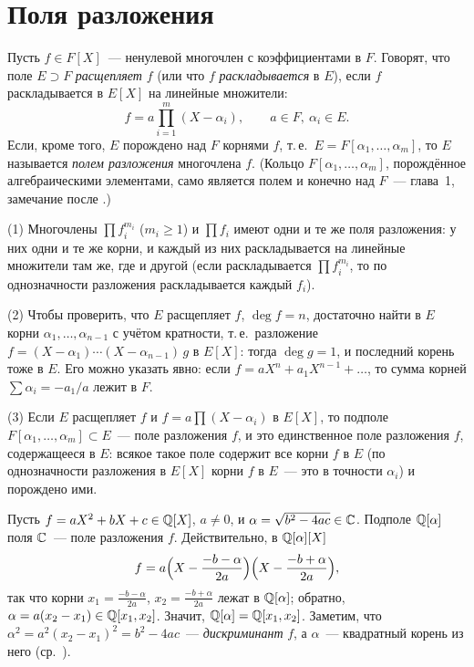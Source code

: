 \section{Поля разложения}

Пусть $f\in F[X]$~--- ненулевой многочлен с коэффициентами в $F$. Говорят, что поле $E\supset F$ \emph{расщепляет} $f$ (или что
$f$ \emph{раскладывается} в $E$), если $f$ раскладывается в $E[X]$ на линейные множители:
\[
f=a\prod_{i=1}^m(X-\alpha_i),\qquad a\in F,\ \alpha_i\in E .
\]
Если, кроме того, $E$ порождено над $F$ корнями $f$, т.\,е.\ $E=F[\alpha_1,\dots,\alpha_m]$, то $E$ называется \emph{полем
разложения} многочлена $f$. (Кольцо $F[\alpha_1,\dots,\alpha_m]$, порождённое алгебраическими элементами, само является
полем и конечно над $F$~--- глава~1, замечание после .)

\begin{remark}[2.4e]
(1) Многочлены $\prod f_i^{m_i}$ ($m_i\ge1$) и $\prod f_i$ имеют одни и те же поля разложения: у них одни и те же корни, и
каждый из них раскладывается на линейные множители там же, где и другой (если раскладывается $\prod f_i^{m_i}$, то по
однозначности разложения раскладывается каждый $f_i$).

(2) Чтобы проверить, что $E$ расщепляет $f$, $\deg f=n$, достаточно найти в $E$ корни $\alpha_1,\dots,\alpha_{n-1}$ с
учётом кратности, т.\,е.\ разложение $f=(X-\alpha_1)\cdots(X-\alpha_{n-1})\,g$ в $E[X]$: тогда $\deg g=1$, и последний
корень тоже в $E$. Его можно указать явно: если $f=aX^n+a_1X^{n-1}+\dots$, то сумма корней $\sum\alpha_i=-a_1/a$ лежит в $F$.

(3) Если $E$ расщепляет $f$ и $f=a\prod(X-\alpha_i)$ в $E[X]$, то подполе $F[\alpha_1,\dots,\alpha_m]\subset E$~--- поле
разложения $f$, и это единственное поле разложения $f$, содержащееся в $E$: всякое такое поле содержит все корни $f$ в
$E$ (по однозначности разложения в $E[X]$ корни $f$ в $E$~--- это в точности $\alpha_i$) и порождено ими.
\end{remark}

\begin{example}[2.5]
Пусть $f=aX^2+bX+c\in\mathbb Q[X]$, $a\ne0$, и $\alpha=\sqrt{b^2-4ac}\in\mathbb C$. Подполе $\mathbb Q[\alpha]$ поля $\mathbb C$~--- поле разложения $f$.
Действительно, в $\mathbb Q[\alpha][X]$
\[
f=a\Bigl(X-\frac{-b-\alpha}{2a}\Bigr)\Bigl(X-\frac{-b+\alpha}{2a}\Bigr),
\]
так что корни $x_1=\frac{-b-\alpha}{2a}$, $x_2=\frac{-b+\alpha}{2a}$ лежат в $\mathbb Q[\alpha]$; обратно, $\alpha=a(x_2-x_1)\in\mathbb Q[x_1,x_2]$.
Значит, $\mathbb Q[\alpha]=\mathbb Q[x_1,x_2]$. Заметим, что $\alpha^2=a^2(x_2-x_1)^2=b^2-4ac$~--- \emph{дискриминант} $f$, а $\alpha$~---
квадратный корень из него (ср.\ ).
\end{example}

